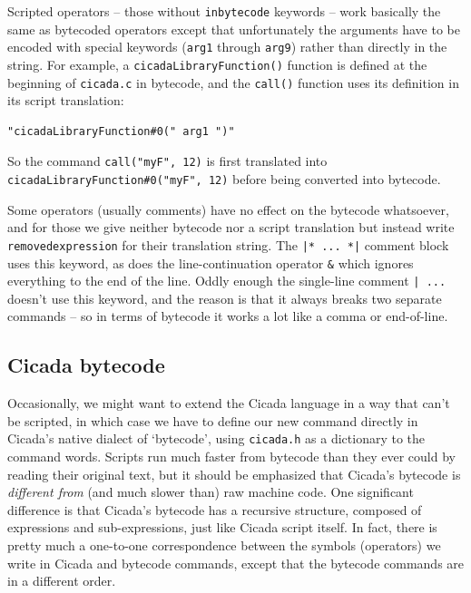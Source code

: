 \documentclass{article}
\newenvironment{code}{
       \begin{list}{}{
               \setlength{\leftmargin}{.4in}
               \setlength{\rightmargin}{0in}
               \setlength{\topsep}{.2in}
       }
       \small
       \item[] }
       { \end{list}   }
\begin{document}
Scripted operators -- those without \verb#inbytecode# keywords -- work basically the same as bytecoded operators except that unfortunately the arguments have to be encoded with special keywords (\verb#arg1# through \verb#arg9#) rather than directly in the string.  For example, a \verb#cicadaLibraryFunction()# function is defined at the beginning of \verb#cicada.c# in bytecode, and the \verb#call()# function uses its definition in its script translation:

\begin{code} \begin{verbatim}
"cicadaLibraryFunction#0(" arg1 ")"
\end{verbatim} \end{code}

\noindent So the command \verb#call("myF", 12)# is first translated into \verb$cicadaLibraryFunction#0("myF", 12)$ before being converted into bytecode.

Some operators (usually comments) have no effect on the bytecode whatsoever, and for those we give neither bytecode nor a script translation but instead write \verb#removedexpression# for their translation string.  The \verb#|* ... *|# comment block uses this keyword, as does the line-continuation operator \verb#&# which ignores everything to the end of the line.  Oddly enough the single-line comment \verb#| ...# doesn't use this keyword, and the reason is that it always breaks two separate commands -- so in terms of bytecode it works a lot like a comma or end-of-line. 






\subsection{Cicada bytecode}

Occasionally, we might want to extend the Cicada language in a way that can't be scripted, in which case we have to define our new command directly in Cicada's native dialect of `bytecode', using \verb#cicada.h# as a dictionary to the command words.  Scripts run much faster from bytecode than they ever could by reading their original text, but it should be emphasized that Cicada's bytecode is \emph{different from} (and much slower than) raw machine code.  One significant difference is that Cicada's bytecode has a recursive structure, composed of expressions and sub-expressions, just like Cicada script itself.  In fact, there is pretty much a one-to-one correspondence between the symbols (operators) we write in Cicada and bytecode commands, except that the bytecode commands are in a different order.
\end{document}
